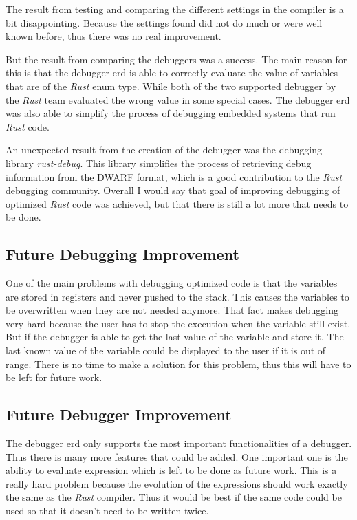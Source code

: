 
The result from testing and comparing the different settings in the compiler is a bit disappointing.
Because the settings found did not do much or were well known before, thus there was no real improvement.


But the result from comparing the debuggers was a success.
The main reason for this is that the debugger \gls{erd} is able to correctly evaluate the value of variables that are of the \emph{Rust} enum type.
While both of the two supported debugger by the \emph{Rust} team evaluated the wrong value in some special cases.
The debugger \gls{erd} was also able to simplify the process of debugging embedded systems that run \emph{Rust} code.


An unexpected result from the creation of the debugger was the debugging library \emph{rust-debug}.
This library simplifies the process of retrieving debug information from the \gls{DWARF} format, which is a good contribution to the \emph{Rust} debugging community.
Overall I would say that goal of improving debugging of optimized \emph{Rust} code was achieved, but that there is still a lot more that needs to be done.


\subsection{Future Debugging Improvement}
One of the main problems with debugging optimized code is that the variables are stored in registers and never pushed to the stack.
This causes the variables to be overwritten when they are not needed anymore.
That fact makes debugging very hard because the user has to stop the execution when the variable still exist.
But if the debugger is able to get the last value of the variable and store it.
The last known value of the variable could be displayed to the user if it is out of range.
There is no time to make a solution for this problem, thus this will have to be left for future work.


\subsection{Future Debugger Improvement}
The debugger \gls{erd} only supports the most important functionalities of a debugger.
Thus there is many more features that could be added.
One important one is the ability to evaluate expression which is left to be done as future work.
This is a really hard problem because the evolution of the expressions should work exactly the same as the \emph{Rust} compiler.
Thus it would be best if the same code could be used so that it doesn't need to be written twice.


